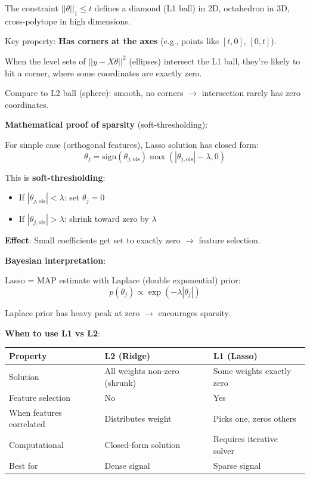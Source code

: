 The constraint $||\theta||_1 \leq t$ defines a diamond (L1 ball) in 2D, octahedron in 3D, cross-polytope in high dimensions.

Key property: \textbf{Has corners at the axes} (e.g., points like $[t, 0]$, $[0, t]$).

When the level sets of $||y - X\theta||^2$ (ellipses) intersect the L1 ball, they're likely to hit a corner, where some coordinates are exactly zero.

Compare to L2 ball (sphere): smooth, no corners $\rightarrow$ intersection rarely has zero coordinates.

\textbf{Mathematical proof of sparsity} (soft-thresholding):

For simple case (orthogonal features), Lasso solution has closed form:
\begin{equation}
\theta_j = \text{sign}(\theta_{j,\text{ols}}) \max(|\theta_{j,\text{ols}}| - \lambda, 0)
\end{equation}

This is \textbf{soft-thresholding}:
\begin{itemize}
    \item If $|\theta_{j,\text{ols}}| < \lambda$: set $\theta_j = 0$
    \item If $|\theta_{j,\text{ols}}| > \lambda$: shrink toward zero by $\lambda$
\end{itemize}

\textbf{Effect}: Small coefficients get set to exactly zero $\rightarrow$ feature selection.

\textbf{Bayesian interpretation}:

Lasso = MAP estimate with Laplace (double exponential) prior:
\begin{equation}
p(\theta_j) \propto \exp(-\lambda|\theta_j|)
\end{equation}

Laplace prior has heavy peak at zero $\rightarrow$ encourages sparsity.

\textbf{When to use L1 vs L2}:

\begin{table}[h]
\centering
\begin{tabular}{lll}
\toprule
\textbf{Property} & \textbf{L2 (Ridge)} & \textbf{L1 (Lasso)} \\
\midrule
Solution & All weights non-zero (shrunk) & Some weights exactly zero \\
Feature selection & No & Yes \\
When features correlated & Distributes weight & Picks one, zeros others \\
Computational & Closed-form solution & Requires iterative solver \\
Best for & Dense signal & Sparse signal \\
\bottomrule
\end{tabular}
\end{table}

